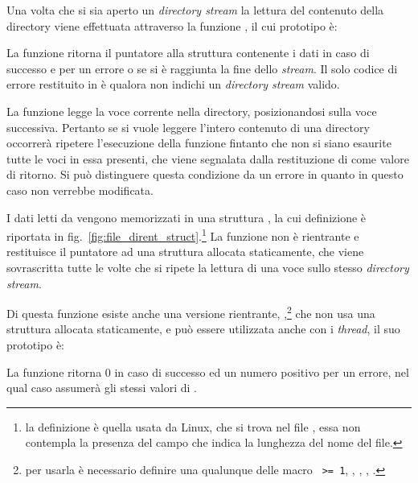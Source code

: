 Una volta che si sia aperto un \textit{directory stream} la lettura del
contenuto della directory viene effettuata attraverso la funzione
, il cui prototipo è:

\begin{funcproto}{
}
{La funzione ritorna il puntatore alla struttura contenente i dati in caso di
  successo e  per un errore o se si è raggiunta la fine dello
  \textit{stream}. Il solo codice di errore restituito in  è
   qualora  non indichi un \textit{directory stream}
  valido.}
\end{funcproto}

La funzione legge la voce corrente nella directory, posizionandosi sulla voce
successiva. Pertanto se si vuole leggere l'intero contenuto di una directory
occorrerà ripetere l'esecuzione della funzione fintanto che non si siano
esaurite tutte le voci in essa presenti, che viene segnalata dalla
restituzione di  come valore di ritorno. Si può distinguere questa
condizione da un errore in quanto in questo caso  non verrebbe
modificata.

I dati letti da  vengono memorizzati in una struttura
, la cui definizione è riportata in
fig.~\ref{fig:file_dirent_struct}.\footnote{la definizione è quella usata da
  Linux, che si trova nel file , essa non
  contempla la presenza del campo  che indica la lunghezza del
  nome del file.} La funzione non è rientrante e restituisce il puntatore ad
una struttura allocata staticamente, che viene sovrascritta tutte le volte che
si ripete la lettura di una voce sullo stesso \textit{directory stream}.

Di questa funzione esiste anche una versione rientrante,
,\footnote{per usarla è necessario definire una qualunque
  delle macro \texttt{ >= 1},
  , , ,
  .} che non usa una struttura allocata staticamente, e
può essere utilizzata anche con i \textit{thread}, il suo prototipo è:

\begin{funcproto}{
}
{La funzione ritorna $0$ in caso di successo ed un numero positivo per un
  errore, nel qual caso  assumerà gli stessi valori di
  .} 
\end{funcproto}

